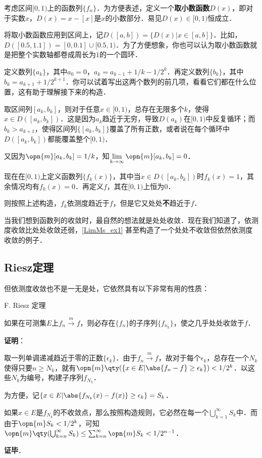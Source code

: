 \begin{example}{}\label{LimMs_ex1}

考虑区间$[0, 1)$上的函数列$\{f_n\}$．为方便表述，定义一个\textbf{取小数函数}$D(x)$，即对于实数$x$，$D(x)=x-[x]$是$x$的小数部分．易见$D(x)\in [0, 1)$恒成立．

将取小数函数应用到区间上，记$D([a, b])=\{D(x)|x\in[a, b]\}$．比如，$D([0.5, 1.1])=[0, 0.1]\cup[0.5, 1)$．为了方便想象，你也可以认为取小数函数就是把整个实数轴都卷成周长为$1$的一个圆环．

定义数列$\{a_k\}$，其中$a_0=0$，$a_k=a_{k-1}+1/k-1/2^k$．再定义数列$\{b_k\}$，其中$b_k=a_{k+1}+1/2^{k+1}$．你可以试着写出这两个数列的前几项，看看它们都在什么位置，这有助于理解接下来的构造．

取区间列$[a_k, b_k]$，则对于任意$x\in[0, 1)$，总存在无限多个$k$，使得$x\in D([a_k, b_k])$．这是因为$a_k$趋近于无穷，导致$D(a_k)$在$[0, 1)$中反复循环；而$b_k>a_{k+1}$，使得区间列$\{[a_k, b_k]\}$覆盖了所有正数，或者说在每个循环中$D([a_k, b_k])$都能覆盖整个$[0, 1)$．

又因为$\opn{m}[a_k, b_k]=1/k$，知$\lim\limits_{k\to \infty}\opn{m}[a_k, b_k]=0$．

现在在$[0, 1)$上定义函数列$\{f_k(x)\}$，其中当$x\in D([a_k, b_k])$时$f_k(x)=1$，其余情况均有$f_k(x)=0$．再定义$f$，其在$[0, 1)$上恒为$0$．

则按照上述构造，$f_k$依测度趋近于$f$，但是它又处处\textbf{不}趋近于$f$．

\end{example}

当我们想到函数列的收敛时，最自然的想法就是处处收敛．现在我们知道了，依测度收敛比处处收敛还弱，\autoref{LimMs_ex1} 甚至构造了一个处处不收敛但依然依测度收敛的例子．


\subsection{Riesz定理}



但依测度收敛也不是一无是处，它依然具有以下非常有用的性质：

\begin{theorem}{F. Riesz 定理}

如果在可测集$E$上$f_n\overset{m}\to f$，则必存在$\{f_n\}$的子序列$\{f_{n_k}\}$，使之几乎处处收敛于$f$．

\end{theorem}

\textbf{证明}：

取一列单调递减趋近于零的正数$\{\epsilon_k\}$．由于$f_n\overset{m}\to f$，故对于每个$\epsilon_k$，总存在一个$N_k$使得只要$n\geq N_k$，就有$\opn{m}\qty(\{x\in E|\abs{f_n-f}\geq\epsilon_k\})<1/2^k$．以这些$N_k$为编号，构建子序列$f_{N_k}$．

为方便，记$\{x\in E|\abs{f_{N_k}(x)-f(x)}\geq \epsilon_k\}=S_k$．

如果$x\in E$是$f_{N_k}$的不收敛点，那么按照构造规则，它必然在每一个$\bigcup^\infty_{k=1}S_k$中．而由于$\opn{m}S_k<1/2^k$，可知$\opn{m}\qty(\bigcup^\infty_{k=n}S_k)\leq \sum^{\infty}_{k=n}\opn{m}S_k<1/2^{n-1}$．



\textbf{证毕}．





